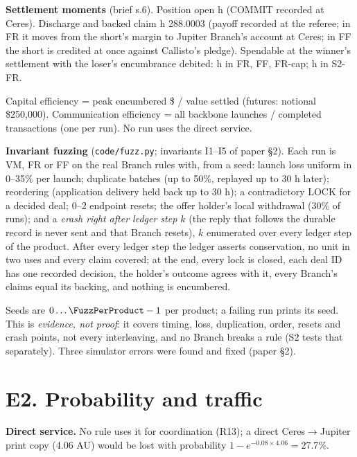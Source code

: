 \textbf{Settlement moments} (brief s.6). Position open h \SimFutOpen (COMMIT recorded at Ceres). Discharge and backed claim h 288.0003 (payoff recorded at the referee; in FR it moves from the short's margin to Jupiter Branch's account at Ceres; in FF the short is credited at once against Callisto's pledge). Spendable at the winner's settlement with the loser's encumbrance debited: h \SimFutSpendable in FR, FF, FR-cap; h \SimSTwoFRSpendable in S2-FR.

\smallskip
Capital efficiency = peak encumbered \$ / value settled (futures: notional \$250{,}000). Communication efficiency =
all backbone launches / completed transactions (one per run). No run uses the direct service.


\textbf{Invariant fuzzing} (\texttt{code/fuzz.py}; invariants I1--I5 of paper \S2). Each run is VM, FR or FF on the real Branch rules with, from a seed: launch loss uniform in 0--35\% per launch; duplicate batches (up to 50\%, replayed up to 30 h later); reordering (application delivery held back up to 30 h); a contradictory LOCK for a decided deal; 0--2 endpoint resets; the offer holder's local withdrawal (30\% of runs); and a \emph{crash right after ledger step $k$} (the reply that follows the durable record is never sent and that Branch resets), $k$ enumerated over every ledger step of the product. After every ledger step the ledger asserts conservation, no unit in two uses and every claim covered; at the end, every lock is closed, each deal ID has one recorded decision, the holder's outcome agrees with it, every Branch's claims equal its backing, and nothing is encumbered.
\begin{center}\setlength{\tabcolsep}{4pt}\end{center}
Seeds are $0\ldots\FuzzPerProduct-1$ per product; a failing run prints its seed. This is \emph{evidence, not proof}: it covers timing, loss, duplication, order, resets and crash points, not every interleaving, and no Branch breaks a rule (S2 tests that separately). Three simulator errors were found and fixed (paper \S2).

\section*{E2. Probability and traffic}

\textbf{Direct service.} No rule uses it for coordination (R13); a direct Ceres$\to$Jupiter print copy (4.06 AU) would be lost with probability $1-e^{-0.08\times4.06} = 27.7\%$.

